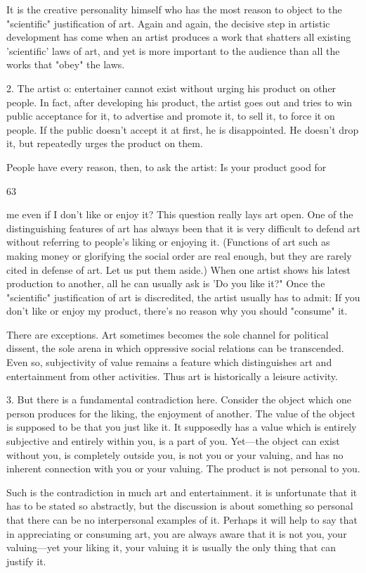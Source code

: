 \documentclass[10pt,twoside]{memoir}
\begin{document}
\begin{enumerate}
{{{{{{{{{{{{{{It is the creative personality himself who has the most reason to object to 
the "scientific" justification of art. Again and again, the decisive step in 
artistic development has come when an artist produces a work that shatters 
all existing 'scientific' laws of art, and yet is more important to the 
audience than all the works that "obey" the laws. 

2. The artist o: entertainer cannot exist without urging his product on other 
people. In fact, after developing his product, the artist goes out and tries to 
win public acceptance for it, to advertise and promote it, to sell it, to force it 
on people. If the public doesn't accept it at first, he is disappointed. He 
doesn't drop it, but repeatedly urges the product on them. 

People have every reason, then, to ask the artist: Is your product good for 


63 


me even if I don't like or enjoy it? This question really lays art open. One of 
the distinguishing features of art has always been that it is very difficult to 
defend art without referring to people's liking or enjoying it. (Functions of 
art such as making money or glorifying the social order are real enough, but 
they are rarely cited in defense of art. Let us put them aside.) When one 
artist shows his latest production to another, all he can usually ask is 'Do 
you like it?" Once the "scientific" justification of art is discredited, the 
artist usually has to admit: If you don't like or enjoy my product, there's no 
reason why you should "consume" it. 

There are exceptions. Art sometimes becomes the sole channel for political 
dissent, the sole arena in which oppressive social relations can be 
transcended. Even so, subjectivity of value remains a feature which 
distinguishes art and entertainment from other activities. Thus art is 
historically a leisure activity. 

3. But there is a fundamental contradiction here. Consider the object which 
one person produces for the liking, the enjoyment of another. The value of 
the object is supposed to be that you just like it. It supposedly has a value 
which is entirely subjective and entirely within you, is a part of you. Yet---the 
object can exist without you, is completely outside you, is not you or your 
valuing, and has no inherent connection with you or your valuing. The 
product is not personal to you. 

Such is the contradiction in much art and entertainment. it is unfortunate 
that it has to be stated so abstractly, but the discussion is about something 
so personal that there can be no interpersonal examples of it. Perhaps it will 
help to say that in appreciating or consuming art, you are always aware that 
it is not you, your valuing---yet your liking it, your valuing it is usually the 
only thing that can justify it. 

}}}}}}}}}}}}}}
\end{enumerate}
\end{document}
